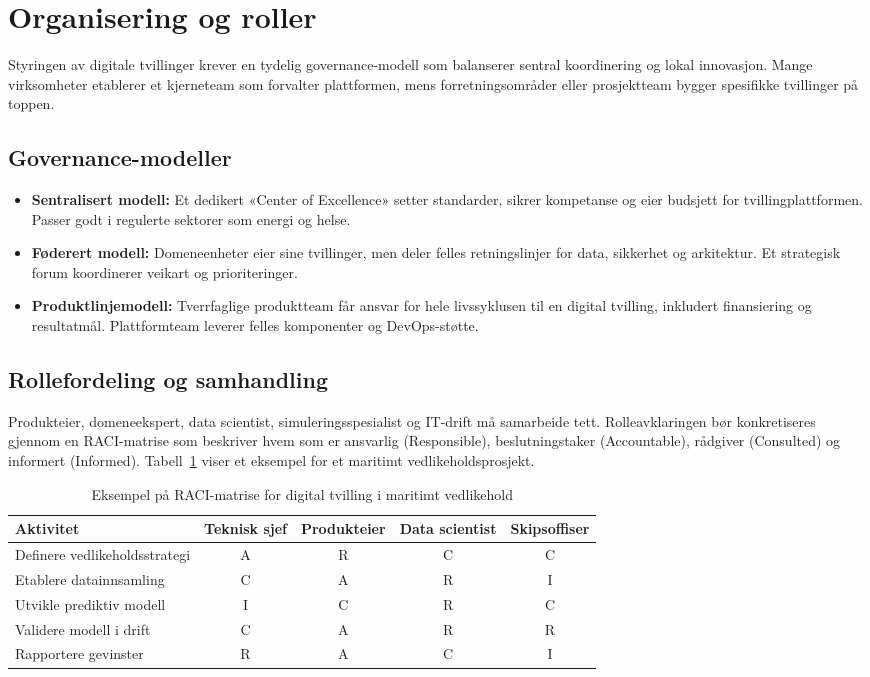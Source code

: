 \section{Organisering og roller}
Styringen av digitale tvillinger krever en tydelig governance-modell som balanserer sentral koordinering og lokal innovasjon. Mange virksomheter etablerer et kjerneteam som forvalter plattformen, mens forretningsområder eller prosjektteam bygger spesifikke tvillinger på toppen.

\subsection*{Governance-modeller}
\begin{itemize}
    \item \textbf{Sentralisert modell:} Et dedikert «Center of Excellence» setter standarder, sikrer kompetanse og eier budsjett for tvillingplattformen. Passer godt i regulerte sektorer som energi og helse.
    \item \textbf{Føderert modell:} Domeneenheter eier sine tvillinger, men deler felles retningslinjer for data, sikkerhet og arkitektur. Et strategisk forum koordinerer veikart og prioriteringer.
    \item \textbf{Produktlinjemodell:} Tverrfaglige produktteam får ansvar for hele livssyklusen til en digital tvilling, inkludert finansiering og resultatmål. Plattformteam leverer felles komponenter og DevOps-støtte.
\end{itemize}

\subsection*{Rollefordeling og samhandling}
Produkteier, domeneekspert, data scientist, simuleringsspesialist og IT-drift må samarbeide tett. Rolleavklaringen bør konkretiseres gjennom en RACI-matrise som beskriver hvem som er ansvarlig (Responsible), beslutningstaker (Accountable), rådgiver (Consulted) og informert (Informed). Tabell~\ref{tab:raci-maritim} viser et eksempel for et maritimt vedlikeholdsprosjekt.

\begin{table}[h]
    \centering
    \caption{Eksempel på RACI-matrise for digital tvilling i maritimt vedlikehold}
    \label{tab:raci-maritim}
    \begin{tabular}{p{4cm}cccc}
        \toprule
        Aktivitet & Teknisk sjef & Produkteier & Data scientist & Skipsoffiser \\
        \midrule
        Definere vedlikeholdsstrategi & A & R & C & C \\
        Etablere datainnsamling & C & A & R & I \\
        Utvikle prediktiv modell & I & C & R & C \\
        Validere modell i drift & C & A & R & R \\
        Rapportere gevinster & R & A & C & I \\
        \bottomrule
    \end{tabular}
\end{table}

